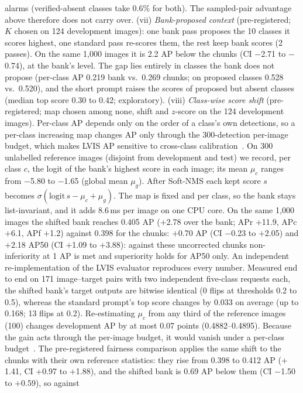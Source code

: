 \documentclass[10pt,twocolumn,letterpaper]{article}
\begin{document}
alarms (verified-absent classes take 0.6\% for both). The sampled-pair advantage above therefore does not carry over.
(vii) \emph{Bank-proposed context} (pre-registered; $K$ chosen on 124 development images): one bank pass proposes
the 10 classes it scores highest, one standard pass re-scores them, the rest keep bank scores (2 passes). On the same
1{,}000 images it is 2.2 AP below the chunks (CI $-$2.71 to $-$0.74), at the bank's level. The gap lies entirely in
classes the bank does not propose (per-class AP 0.219 bank vs.\ 0.269 chunks; on proposed classes 0.528 vs.\ 0.520),
and the short prompt raises the scores of proposed but absent classes (median top score 0.30 to 0.42; exploratory).
(viii) \emph{Class-wise score shift} (pre-registered; map chosen among none, shift and $z$-score on the 124 development
images). Per-class AP depends only on the order of a class's own detections, so a per-class increasing map changes AP
only through the 300-detection per-image budget, which makes LVIS AP sensitive to cross-class calibration~\cite{devil}.
On 300 unlabelled reference images (disjoint from development and test) we record, per class $c$, the logit of the
bank's highest score in each image; its mean $\mu_c$ ranges from $-$5.80 to $-$1.65 (global mean $\mu_g$). After
Soft-NMS each kept score $s$ becomes $\sigma(\mathrm{logit}\,s-\mu_c+\mu_g)$. The map is fixed and per class, so the
bank stays list-invariant, and it adds 8.6\,ms per image on one CPU core. On the same 1{,}000 images the shifted bank
reaches 0.405 AP ($+$2.78 over the bank; APr $+$11.9, APc $+$6.1, APf $+$1.2) against 0.398 for the chunks: $+$0.70 AP
(CI $-$0.23 to $+$2.05) and $+$2.18 AP50 (CI $+$1.09 to $+$3.88): against these uncorrected chunks non-inferiority at 1 AP is
met and superiority holds for AP50 only. An independent re-implementation of the LVIS evaluator reproduces every number. Measured end to end on 171 image--target pairs with two
independent five-class requests each, the shifted bank's target outputs are bitwise identical (0 flips at thresholds
0.2 to 0.5), whereas the standard prompt's top score changes by 0.033 on average (up to 0.168; 13 flips at 0.2). Re-estimating
$\mu_c$ from any third of the reference images (100) changes development AP by at most 0.07 points (0.4882--0.4895). Because the gain acts
through the per-image budget, it would vanish under a per-class budget~\cite{devil}. The pre-registered fairness
comparison applies the same shift to the chunks with their own reference statistics: they rise from 0.398 to 0.412 AP
($+$1.41, CI $+$0.97 to $+$1.88), and the shifted bank is 0.69 AP below them (CI $-$1.50 to $+$0.59), so against
\end{document}
